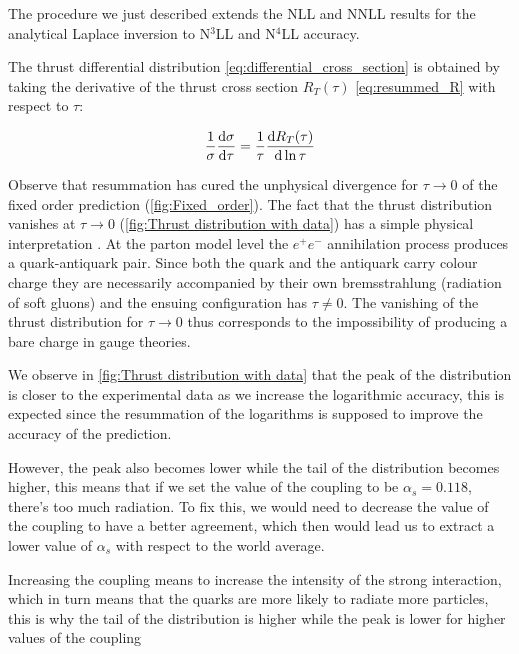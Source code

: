 \documentclass[../Tesi_Jiahao_Miao_986136.tex]{subfiles}
\begin{document}
The procedure we just described extends the NLL \cite{CATANI19933} and NNLL \cite{Monni:2011gb} results for the analytical Laplace inversion to N$^3$LL and N$^4$LL accuracy.

The thrust differential distribution \cref{eq:differential_cross_section} is obtained by taking the derivative of the thrust cross section 
$R_T(\tau)$ \cref{eq:resummed_R} with respect to $\tau$:

\begin{equation}
    \frac{1}{\sigma} \dv{\sigma}{\tau} = \frac{1}{\tau} \dv{R_T(\tau)}{\ln \tau} 
\end{equation}

Observe that resummation has cured the unphysical divergence for $\tau \to 0$ of the fixed order prediction (\cref{fig:Fixed_order}).
The fact that the thrust distribution vanishes at $\tau \to 0$ (\cref{fig:Thrust distribution with data}) has a simple physical interpretation \cite{CATANI19933}.
At the parton model level the $e^+e^-$ annihilation process produces a quark-antiquark pair. Since both the quark and the antiquark carry
colour charge they are necessarily accompanied by their own bremsstrahlung (radiation of soft gluons) and the ensuing configuration has $\tau \neq 0$.
The vanishing of the thrust distribution for $\tau \to 0$ thus corresponds to the impossibility of producing
a bare charge in gauge theories.

We observe in \cref{fig:Thrust distribution with data} that the peak of the distribution is closer to the experimental data as we increase the logarithmic accuracy,
this is expected since the resummation of the logarithms is supposed to improve the accuracy of the prediction.

However, the peak also becomes lower while the tail of the distribution becomes higher, this means that if we set the value of the coupling to be $\alpha_s=0.118$, there's 
too much radiation. To fix this, we would need to decrease the value of the coupling to have a better agreement, which then would lead us to extract a lower value of $\alpha_s$ with respect to the world average. 

Increasing the coupling means to increase the intensity of the strong interaction, which in turn means that the quarks are more likely to radiate more particles, 
this is why the tail of the distribution is higher while the peak is lower for higher values of the coupling
\end{document}
